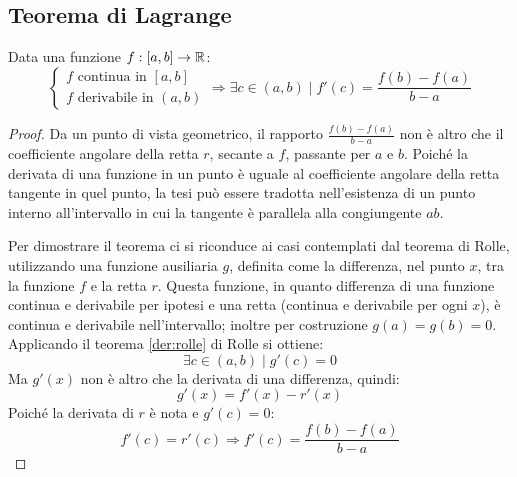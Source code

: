 \subsection{Teorema di Lagrange}
\begin{teor}[di Lagrange]
	\label{der:lagrange}
	Data una funzione $f:[a,b]\to\mathbb{R}$:
	\[
		\begin{cases}
			f\text{ continua in } [a,b] \\
			f\text{ derivabile in } (a,b)
		\end{cases}\Rightarrow
		\exists c\in(a,b)\mid f'(c)=\frac{f(b)-f(a)}{b-a}
	\]
\end{teor}
\begin{proof}
	Da un punto di vista geometrico, il rapporto $\frac{f(b)-f(a)}{b-a}$ non è altro che il coefficiente angolare della retta $r$, secante a $f$, passante per $a$ e $b$. Poiché la derivata di una funzione in un punto è uguale al coefficiente angolare della retta tangente in quel punto, la tesi può essere tradotta nell'esistenza di un punto interno all'intervallo in cui la tangente è parallela alla congiungente $ab$.

	Per dimostrare il teorema ci si riconduce ai casi contemplati dal teorema di Rolle, utilizzando una funzione ausiliaria $g$, definita come la differenza, nel punto $x$, tra la funzione $f$ e la retta $r$. Questa funzione, in quanto differenza di una funzione continua e derivabile per ipotesi e una retta (continua e derivabile per ogni $x$), è continua e derivabile nell'intervallo; inoltre per costruzione $g(a)=g(b)=0$. Applicando il teorema \ref{der:rolle} di Rolle si ottiene:
	\[
		\exists c\in(a,b)\mid g'(c)=0
	\]
	Ma $g'(x)$ non è altro che la derivata di una differenza, quindi:
	\[
		g'(x)=f'(x)-r'(x)
	\]
	Poiché la derivata di $r$ è nota e $g'(c)=0$:
	\[
		f'(c)=r'(c)\Rightarrow f'(c)=\frac{f(b)-f(a)}{b-a}
	\]
\end{proof}

